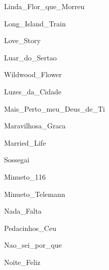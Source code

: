 \documentclass{scrartcl}
\begin{document}

{Linda_Flor_que_Morreu}


{Long_Island_Train}


{Love_Story}


{Luar_do_Sertao}


{Wildwood_Flower}


{Luzes_da_Cidade}


{Mais_Perto_meu_Deus_de_Ti}


{Maravilhosa_Graca}


{Married_Life}


{Sossegai}


{Minueto_116}


{Minueto_Telemann}


{Nada_Falta}


{Pedacinhos_Ceu}


{Nao_sei_por_que}


{Noite_Feliz}
\end{document}
